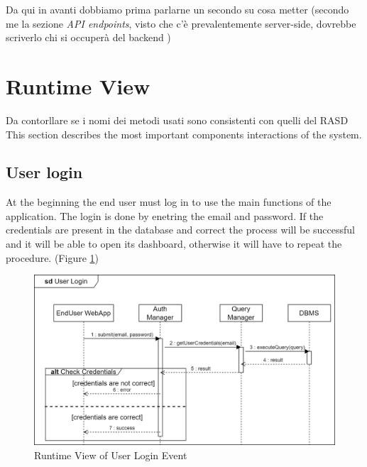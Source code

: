 {\color{red} Da qui in avanti dobbiamo prima parlarne un secondo su cosa metter (secondo me la sezione \textit{API endpoints}, visto che c'è prevalentemente server-side, dovrebbe scriverlo chi si occuperà del backend )\\}
\newpage

\section{Runtime View}
{\color{green} Da contorllare se i nomi dei metodi usati sono consistenti con quelli del RASD\\}
This section describes the most important components interactions of the system.

\subsection{User login}
At the beginning the end user must log in to use the main functions of the application. The login is done by enetring the email and password. If the credentials are present in the database and correct the process will be successful and it will be able to open its dashboard, otherwise it will have to repeat the procedure. (Figure \ref{fig:RuntimeView_UserLogin})
\begin{figure}[H]
    \centering
    \includegraphics[width=\textwidth]{images/runtimeviews/RuntimeView_UserLogin.png}
    \caption{Runtime View of User Login Event}
    \label{fig:RuntimeView_UserLogin}
\end{figure}

